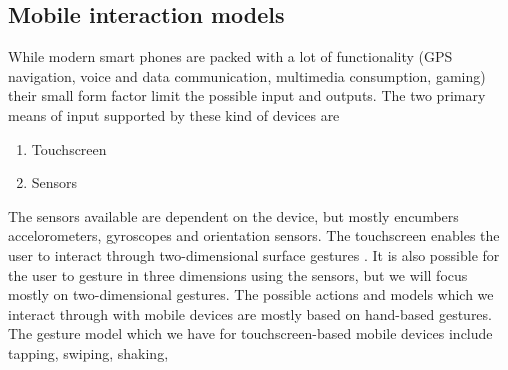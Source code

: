 \subsection{Mobile interaction models} %
While modern smart phones are packed with a lot of functionality (GPS navigation, voice and data communication, multimedia consumption, gaming) their small form factor limit the possible input and outputs. The two primary means of input supported by these kind of devices are
\begin{enumerate}
  \item Touchscreen
  \item Sensors
\end{enumerate}
The sensors available are dependent on the device, but mostly encumbers accelorometers, gyroscopes and orientation sensors. The touchscreen enables the user to interact through two-dimensional surface gestures \cite{Ruiz2011}. It is also possible for the user to gesture in three dimensions using the sensors, but we will focus mostly on two-dimensional gestures.
The possible actions and models which we interact through with mobile devices are mostly based on hand-based gestures. The gesture model which we have for touchscreen-based mobile devices include tapping, swiping, shaking,






